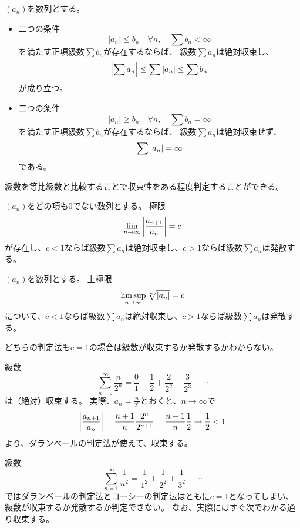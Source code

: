 \begin{proposition}[級数の比較判定法]
$(a_n)$を数列とする。
\begin{itemize}
\item
二つの条件
$$
|a_n| \le b_n \quad \forall n,
\quad \sum b_n < \infty
$$
を満たす正項級数$\sum b_n$が存在するならば、
級数$\sum a_n$は絶対収束し、
$$
\abs{\sum a_n} \le \sum \abs{a_n} \le \sum b_n
$$
が成り立つ。
\item
二つの条件
$$
|a_n| \ge b_n \quad \forall n,
\quad \sum b_n = \infty
$$
を満たす正項級数$\sum b_n$が存在するならば、
級数$\sum a_n$は絶対収束せず、
$$
\sum \abs{a_n} = \infty
$$
である。
\end{itemize}
\end{proposition}

級数を等比級数と比較することで収束性をある程度判定することができる。

\begin{theorem}[ダランベールの判定法]
$(a_n)$をどの項も$0$でない数列とする。
極限
$$
\lim_{n \to \infty}\abs{\frac{a_{n+1}}{a_n}} = c
$$
が存在し、$c < 1$ならば級数$\sum a_n$は絶対収束し、$c > 1$ならば級数$\sum a_n$は発散する。
\end{theorem}

\begin{theorem}[コーシーの判定法]
$(a_n)$を数列とする。
上極限
$$
\limsup_{n \to \infty}\sqrt[n]{\abs{a_n}} = c
$$
について、$c < 1$ならば級数$\sum a_n$は絶対収束し、$c > 1$ならば級数$\sum a_n$は発散する。
\end{theorem}

\begin{remark}
どちらの判定法も$c = 1$の場合は級数が収束するか発散するかわからない。
\end{remark}

\begin{example}
級数
$$
\sum_{n = 0}^\infty \frac{n}{2^n} = \frac{0}{1}+\frac{1}{2}+\frac{2}{2^2}+\frac{3}{2^3}+\cdots
$$
は（絶対）収束する。
実際、$a_n = \frac{n}{2^n}$とおくと、$n \to \infty$で
$$
\abs{\frac{a_{n+1}}{a_n}} = \frac{n+1}{n}\frac{2^n}{2^{n+1}} = \frac{n+1}{n}\frac{1}{2} \to \frac{1}{2} < 1
$$
より、ダランベールの判定法が使えて、収束する。
\end{example}

\begin{example}
級数
$$
\sum_{n = 1}^\infty \frac{1}{n^2} = \frac{1}{1^2}+\frac{1}{2^2}+\frac{1}{3^2}+\cdots
$$
ではダランベールの判定法とコーシーの判定法はともに$c = 1$となってしまい、級数が収束するか発散するか判定できない。
なお、実際にはすぐ次でわかる通り収束する。
\end{example}

